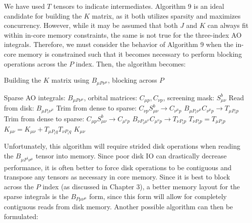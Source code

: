 We have used $T$ tensors to indicate intermediates.
Algorithm 9 is an ideal candidate for building the $K$ matrix, as it both utilizes sparsity and maximizes concurrency.
However, while it may be assumed that both $J$ and $K$ can always fit within in-core memory constraints, the same is not true 
for the three-index AO integrals. Therefore, we must consider the behavior of Algorithm 9 when the 
in-core memory is constrained such that it becomes necessary to perform blocking operations across the $P$ index. Then, the algorithm
becomes: 

\begin{algorithm}[H]
\caption{Building the $K$ matrix using $B_{\mu P \nu^\mu}$, blocking across $P$}
\begin{algorithmic}
\REQUIRE Sparse AO integrals: $B_{\mu P \nu^\mu}$, orbital matrices: $C_{\mu p}, C_{\nu p}$, screening mask: $S_{\mu \nu}^b$
    \STATE Read from disk: $B_{\mu P_i \nu^{\mu}}$
        \STATE Trim from dense to sparse: $C_{\nu p}S_{\mu \nu}^b \rightarrow C_{\nu^{\mu} p}$
        \STATE $B_{\mu P_i \nu^{\mu}} C_{\nu^{\mu} p} \rightarrow T_{\mu P_i p}$
            \STATE Trim from dense to sparse: $C_{\mu p}S_{\mu \nu}^b \rightarrow C_{\mu^{\nu} p}$
            \STATE $B_{\nu P_i \mu^{\nu}} C_{\mu^{\nu} p} \rightarrow T_{\nu P_i p}$
        \ELSE
            \STATE $T_{\nu P_i p} = T_{\mu P_i p}$ 
        \ENDIF
    \ENDFOR
    \STATE $K_{\mu \nu} = K_{\mu \nu} + T_{\mu P_i q} T_{\nu P_i q}$
\ENDFOR
\RETURN $K_{\mu \nu}$
\end{algorithmic}
\end{algorithm}

\noindent Unfortunately, this algorithm will require strided disk operations when reading the $B_{\mu P^i \nu^{\mu}}$ tensor into memory.
Since poor disk IO can drastically decrease performance, it is often better to force disk operations 
to be contiguous and transpose any tensors as necessary in core memory. Since it is best to block across the $P$ index (as discussed in
Chapter 3), a better
memory layout for the sparse integrals is the $B_{P \mu \nu^\mu}$ form, since this form will allow for completely 
contiguous reads from disk memory. Another possible algorithm can then be formulated:

